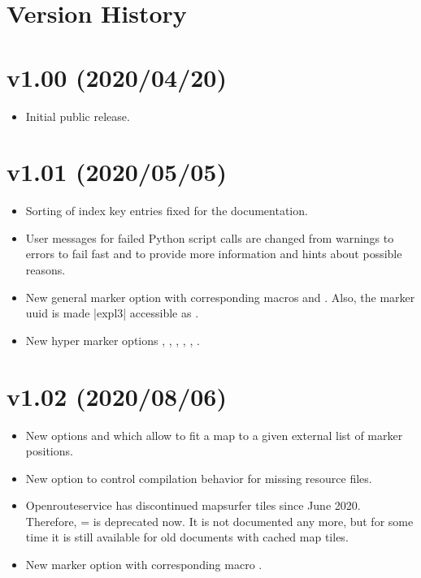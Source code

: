 \clearpage
\section{Version History}%

\section*{v1.00 (2020/04/20)}
\begin{itemize}
\item Initial public release.
\end{itemize}

\section*{v1.01 (2020/05/05)}
\begin{itemize}
\item Sorting of index key entries fixed for the documentation.
\item User messages for failed Python script calls are changed from warnings to
  errors to fail fast and to provide more information and hints about
  possible reasons.
\item New general marker option
   with corresponding macros
  and . Also, the marker uuid is
  made |expl3| accessible as .
\item New hyper marker options
  ,
  ,
  ,
  ,
  ,
  .
\end{itemize}


\section*{v1.02 (2020/08/06)}
\begin{itemize}
\item New options
   and
  which allow to fit a map to a given external list of marker positions.
\item New option  to control
  compilation behavior for missing resource files.
\item Openrouteservice has discontinued mapsurfer tiles since June 2020.\\
  Therefore, =
  is deprecated now. It is not documented any more, but
  for some time it is still available for old documents with
  cached map tiles.
\item{}
  New marker option  with corresponding
  macro .
\end{itemize}
